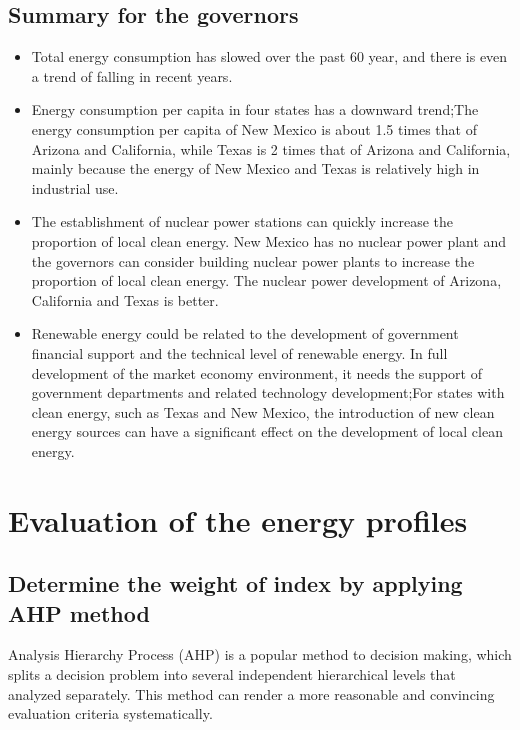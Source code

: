 \subsection{Summary for the governors}

\begin{itemize}
\item Total energy consumption has slowed over the past 60 year, and there is even a trend of falling in recent years.
\item Energy consumption per capita  in four states has a downward trend;The energy consumption per capita  of New Mexico is about 1.5 times that of Arizona and California, while Texas is 2 times that of Arizona and California, mainly because the energy of New Mexico and Texas is relatively high in industrial use.
\item The establishment of nuclear power stations can quickly increase the proportion of local clean energy. New Mexico has no nuclear power plant and the governors can consider building nuclear power plants to increase the proportion of local clean energy. The nuclear power development of Arizona, California and Texas is better.
\item Renewable energy could be related to the development of government financial support and the technical level of renewable energy. In full development of the market economy environment, it needs the support of government departments and related technology development;For states with clean energy, such as Texas and New Mexico, the introduction of new clean energy sources can have a significant effect on the development of local clean energy.

\end{itemize}






\newpage
\section{Evaluation of the energy profiles}
\subsection{Determine the weight of index by applying AHP method}
Analysis Hierarchy Process (AHP) is a popular method to decision making, which splits a decision problem into several independent hierarchical levels that analyzed separately. This method can render a more reasonable and convincing evaluation criteria systematically.



